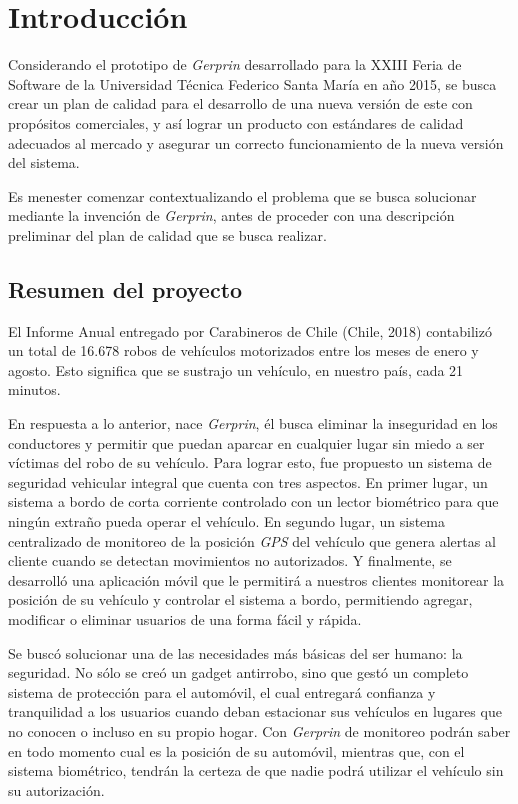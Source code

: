 
\chapter{Introducción}
Considerando el prototipo de \emph{Gerprin} desarrollado para la XXIII Feria de Software de la Universidad Técnica Federico Santa María en año 2015, se busca crear un plan de calidad para el desarrollo de una nueva versión de este con propósitos comerciales, y así lograr un producto con estándares de calidad adecuados al mercado y asegurar un correcto funcionamiento de la nueva versión del sistema.

Es menester comenzar contextualizando el problema que se busca solucionar mediante la invención de \emph{Gerprin}, antes de proceder con una descripción preliminar del plan de calidad que se busca realizar. 

\section{Resumen del proyecto}

El Informe Anual entregado por Carabineros de Chile (Chile, 2018) contabilizó un total de 16.678 robos de vehículos motorizados entre los meses de enero y agosto. Esto significa que se sustrajo un vehículo, en nuestro país, cada 21 minutos.

En respuesta a lo anterior, nace \emph{Gerprin}, él busca eliminar la inseguridad en los conductores y permitir que puedan aparcar en cualquier lugar sin miedo a ser víctimas del robo de su vehículo. Para lograr esto, fue propuesto un sistema de seguridad vehicular integral que cuenta con tres aspectos. En primer lugar, un sistema a bordo de corta corriente controlado con un lector biométrico para que ningún extraño pueda operar el vehículo. En segundo lugar, un sistema centralizado de monitoreo de la posición \emph{GPS} del vehículo que genera alertas al cliente cuando se detectan movimientos no autorizados. Y finalmente, se desarrolló una aplicación móvil que le permitirá a nuestros clientes monitorear la posición de su vehículo y controlar el sistema a bordo, permitiendo agregar, modificar o eliminar usuarios de una forma fácil y rápida.

 Se buscó solucionar una de las necesidades más básicas del ser humano: la seguridad. No sólo se creó un gadget antirrobo, sino que gestó un completo sistema de protección para el automóvil, el cual entregará confianza y tranquilidad a los usuarios cuando deban estacionar sus vehículos en lugares que no conocen o incluso en su propio hogar. Con \emph{Gerprin} de monitoreo podrán saber en todo momento cual es la posición de su automóvil, mientras que, con el sistema biométrico, tendrán la certeza de que nadie podrá utilizar el vehículo sin su autorización.

